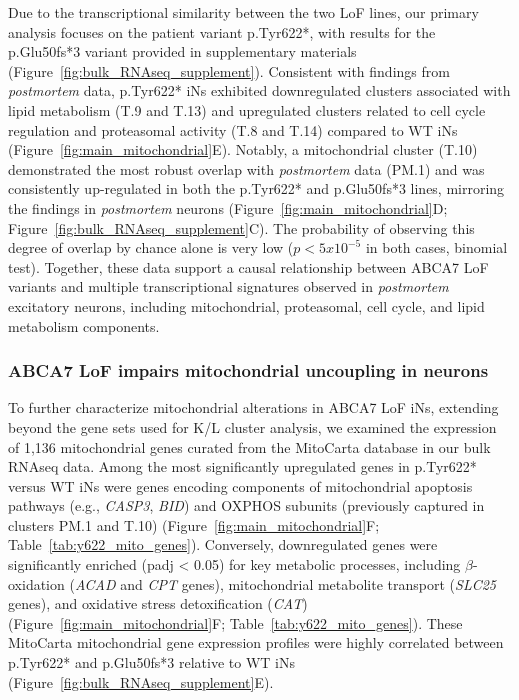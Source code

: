 \documentclass[12pt]{article}
\begin{document}
Due to the transcriptional similarity between the two LoF lines, our primary analysis focuses on the patient variant p.Tyr622*, with results for the p.Glu50fs*3 variant provided in supplementary materials (Figure~\ref{fig:bulk_RNAseq_supplement}). Consistent with findings from \textit{postmortem} data, p.Tyr622* iNs exhibited downregulated clusters associated with lipid metabolism (T.9 and T.13) and upregulated clusters related to cell cycle regulation and proteasomal activity (T.8 and T.14) compared to WT iNs (Figure~\ref{fig:main_mitochondrial}E). Notably, a mitochondrial cluster (T.10) demonstrated the most robust overlap with \textit{postmortem} data (PM.1) and was consistently up-regulated in both the p.Tyr622* and p.Glu50fs*3 lines, mirroring the findings in \textit{postmortem} neurons (Figure~\ref{fig:main_mitochondrial}D; Figure~\ref{fig:bulk_RNAseq_supplement}C). The probability of observing this degree of overlap by chance alone is very low ($p<5x10^{-5}$ in both cases, binomial test). Together, these data support a causal relationship between ABCA7 LoF variants and multiple transcriptional signatures observed in \textit{postmortem} excitatory neurons, including mitochondrial, proteasomal, cell cycle, and lipid metabolism components.

\subsubsection{ABCA7 LoF impairs mitochondrial uncoupling in neurons}
To further characterize mitochondrial alterations in ABCA7 LoF iNs, extending beyond the gene sets used for K/L cluster analysis, we examined the expression of 1,136 mitochondrial genes curated from the MitoCarta database in our bulk RNAseq data. Among the most significantly upregulated genes in p.Tyr622* versus WT iNs were genes encoding components of mitochondrial apoptosis pathways (e.g., \textit{CASP3}, \textit{BID}) and OXPHOS subunits (previously captured in clusters PM.1 and T.10) (Figure~\ref{fig:main_mitochondrial}F; Table~\ref{tab:y622_mito_genes}). Conversely, downregulated genes were significantly enriched (padj < 0.05) for key metabolic processes, including $\beta$-oxidation (\textit{ACAD} and \textit{CPT} genes), mitochondrial metabolite transport (\textit{SLC25} genes), and oxidative stress detoxification (\textit{CAT}) (Figure~\ref{fig:main_mitochondrial}F; Table~\ref{tab:y622_mito_genes}). These MitoCarta mitochondrial gene expression profiles were highly correlated between p.Tyr622* and p.Glu50fs*3 relative to WT iNs (Figure~\ref{fig:bulk_RNAseq_supplement}E).
\end{document}

